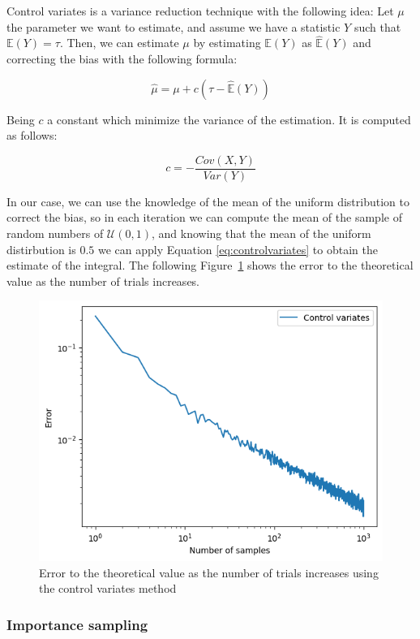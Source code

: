 \documentclass{article}
\begin{document}
Control variates is a variance reduction technique with the following idea: Let \(\mu\) the parameter we want to estimate, and assume we have a statistic \(Y\) such that \(\mathbb{E}(Y) = \tau\). Then, we can estimate \(\mu\) by estimating \(\mathbb{E}(Y)\) as \(\hat{\mathbb{E}}(Y)\) and correcting the bias with the following formula:

\begin{equation} \label{eq:controlvariates} \hat{\mu} = \mu + c(\tau - \hat{\mathbb{E}}(Y)) \end{equation}

Being \(c\) a constant which minimize the variance of the estimation. It is computed as follows:

\begin{equation} 
	\label{eq:controlvariatesconstant} 
	c = -\frac{Cov(X,Y)}{Var(Y)} 
\end{equation}

In our case, we can use the knowledge of the mean of the uniform distribution to correct the bias, so in each iteration we can compute the mean of the sample of random numbers of \(\mathcal{U}(0,1)\), and knowing that the mean of the uniform distirbution is \(0.5\) we can apply Equation \eqref{eq:controlvariates} to obtain the estimate of the integral. The following Figure~\ref{fig:controlvariates} shows the error to the theoretical value as the number of trials increases.

\begin{figure}[H]
	\centering
	\includegraphics[width=0.5\linewidth]{./Figures/VarianceReduction/control.png}
	\caption{Error to the theoretical value as the number of trials increases using the control variates method}
	\label{fig:controlvariates}
\end{figure}

\subsubsection{Importance sampling}
\end{document}
